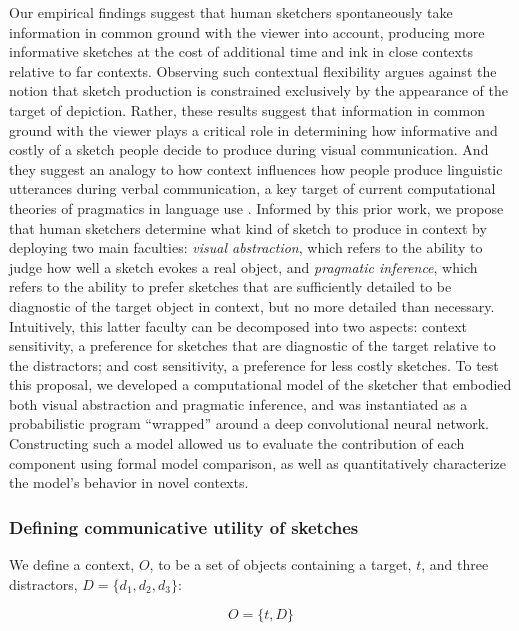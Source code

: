 \documentclass[9pt,twocolumn,twoside]{pnas-new}
\begin{document}
Our empirical findings suggest that human sketchers spontaneously take information in common ground with the viewer into account, producing more informative sketches at the cost of additional time and ink in close contexts relative to far contexts. 
Observing such contextual flexibility argues against the notion that sketch production is constrained exclusively by the appearance of the target of depiction. 
Rather, these results suggest that information in common ground with the viewer plays a critical role in determining how informative and costly of a sketch people decide to produce during visual communication. 
And they suggest an analogy to how context influences how people produce linguistic utterances during verbal communication, a key target of current computational theories of pragmatics in language use \cite{frank2012predicting,goodman2013knowledge,franke2016probabilistic,bergen2016pragmatic}.
Informed by this prior work, we propose that human sketchers determine what kind of sketch to produce in context by deploying two main faculties: \textit{visual abstraction}, which refers to the ability to judge how well a sketch evokes a real object, and \textit{pragmatic inference}, which refers to the ability to prefer sketches that are sufficiently detailed to be diagnostic of the target object in context, but no more detailed than necessary. 
Intuitively, this latter faculty can be decomposed into two aspects: context sensitivity, a preference for sketches that are diagnostic of the target relative to the distractors; and cost sensitivity, a preference for less costly sketches. 
To test this proposal, we developed a computational model of the sketcher that embodied both visual abstraction and pragmatic inference, and was instantiated as a probabilistic program ``wrapped'' around a deep convolutional neural network. 
Constructing such a model allowed us to evaluate the contribution of each component using formal model comparison, as well as quantitatively characterize the model's behavior in novel contexts.

\subsubsection*{Defining communicative utility of sketches}

We define a context, $O$, to be a set of objects containing a target, $t$, and three distractors, $D=\{d_1,d_2,d_3\}$:

\begin{equation} \label{object set}
O = \{t,D\}
\end{equation}
\end{document}
